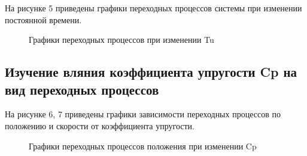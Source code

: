 \documentclass[a4paper, 12pt]{article}
\begin{document}
На рисунке 5 приведены графики переходных процессов системы при изменении постоянной времени.
\newpage
\begin{figure}[h!]
\begin{minipage}[h]{0.49\linewidth}
\end{minipage}
\hfill
\begin{minipage}[h]{0.49\linewidth}
\end{minipage}
\vfill
\begin{minipage}[h]{0.49\linewidth}
\end{minipage}
\hfill
\begin{minipage}[h]{0.49\linewidth}
\end{minipage}
\caption{Графики переходных процессов при изменении Tu}
\end{figure}
\newpage
\begin{center}
	\section{Изучение вляния коэффициента упругости Cp на вид переходных процессов}
\end{center}\par
На рисунке 6, 7 приведены графики зависимости переходных процессов по положению и скорости от коэффициента упругости.
\begin{figure}[h!]
\begin{minipage}[h]{0.49\linewidth}
\end{minipage}
\hfill
\begin{minipage}[h]{0.49\linewidth}
\end{minipage}
\vfill
\begin{minipage}[h]{0.49\linewidth}
\end{minipage}
\caption{Графики переходных процессов положения при изменении Cp}
\end{figure}
\end{document}
